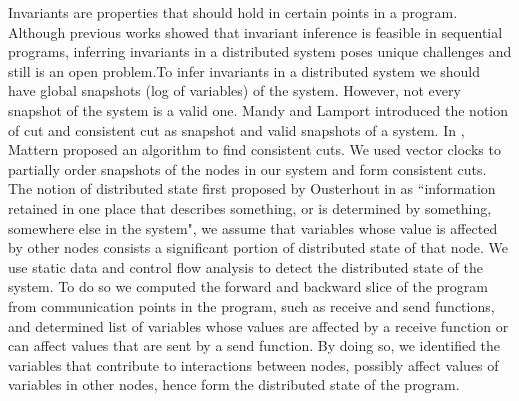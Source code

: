 Invariants are properties that should hold in certain points in a program. Although previous works \cite{ernst2001dynamically} showed that invariant inference is feasible in sequential programs, inferring invariants in a distributed system poses unique challenges and still is an open problem.To infer invariants in a distributed system we should have global snapshots (log of variables) of the system. However, not every snapshot of the system is a valid one. Mandy and Lamport introduced the notion of cut and consistent cut as snapshot and valid snapshots of a system. In \cite{mattern1989virtual}, Mattern proposed an algorithm to find consistent cuts. We used vector clocks \cite{vectorclock} to partially order snapshots of the nodes in our system and form consistent cuts. The notion of distributed state first proposed by Ousterhout in \cite{ousterhout1991role} as ``information retained in one place that describes something, or is determined by something, somewhere else in the system", we assume that variables whose value is affected by other nodes consists a significant portion of distributed state of that node. We use static data and control flow analysis to detect the distributed state of the system. To do so we computed the forward and backward slice of the program  \cite{programslice} from communication points in the program, such as receive and send functions, and determined list of variables whose values are affected by a receive function or can affect values that are sent by a send function. By doing so, we identified the variables that contribute to interactions between nodes, possibly affect values of variables in other nodes, hence form the distributed state of the program.


